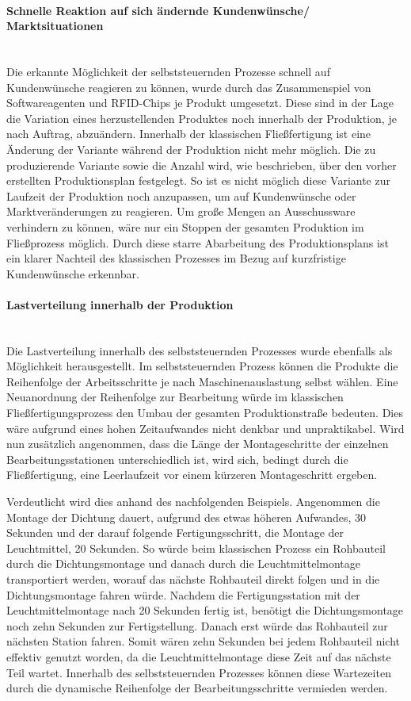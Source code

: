 \paragraph{Schnelle Reaktion auf sich ändernde Kundenwünsche/
Marktsituationen} \hfill \\
Die erkannte Möglichkeit der selbststeuernden Prozesse schnell auf Kundenwünsche
reagieren zu können, wurde durch das Zusammenspiel von Softwareagenten und
RFID-Chips je Produkt umgesetzt. Diese sind in der Lage die Variation eines
herzustellenden Produktes noch innerhalb der Produktion, je nach Auftrag,
abzuändern. Innerhalb der klassischen Fließfertigung ist eine Änderung der
Variante während der Produktion nicht mehr möglich. Die zu produzierende
Variante sowie die Anzahl wird, wie beschrieben, über den vorher erstellten
Produktionsplan festgelegt. So ist es nicht möglich diese Variante zur
Laufzeit der Produktion noch anzupassen, um auf Kundenwünsche oder
Marktveränderungen zu reagieren. Um große Mengen an Ausschussware verhindern zu
können, wäre nur ein Stoppen der gesamten Produktion im Fließprozess möglich.
Durch diese starre Abarbeitung des Produktionsplans ist ein klarer Nachteil des
klassischen Prozesses im Bezug auf kurzfristige Kundenwünsche erkennbar.

\paragraph{Lastverteilung innerhalb der Produktion} \hfill \\
Die Lastverteilung innerhalb des selbststeuernden Prozesses wurde ebenfalls als
Möglichkeit herausgestellt. Im selbststeuernden Prozess können die Produkte die
Reihenfolge der Arbeitsschritte je nach Maschinenauslastung selbst wählen. Eine
Neuanordnung der Reihenfolge zur Bearbeitung würde im klassischen
Fließfertigungsprozess den Umbau der gesamten Produktionstraße bedeuten. Dies
wäre aufgrund eines hohen Zeitaufwandes nicht denkbar und unpraktikabel. Wird
nun zusätzlich angenommen, dass die Länge der Montageschritte der einzelnen
Bearbeitungsstationen unterschiedlich ist, wird sich, bedingt durch die
Fließfertigung, eine Leerlaufzeit vor einem kürzeren Montageschritt ergeben.

Verdeutlicht wird dies anhand des nachfolgenden Beispiels. Angenommen die
Montage der Dichtung dauert, aufgrund des etwas höheren Aufwandes, 30 Sekunden
und der darauf folgende Fertigungsschritt, die Montage der Leuchtmittel, 20
Sekunden. So würde beim klassischen Prozess ein Rohbauteil durch die
Dichtungsmontage und danach durch die Leuchtmittelmontage transportiert werden,
worauf das nächste Rohbauteil direkt folgen und in die Dichtungsmontage fahren
würde. Nachdem die Fertigungsstation mit der Leuchtmittelmontage nach 20
Sekunden fertig ist, benötigt die Dichtungsmontage noch zehn Sekunden zur
Fertigstellung. Danach erst würde das Rohbauteil zur nächsten Station fahren.
Somit wären zehn Sekunden bei jedem Rohbauteil nicht effektiv genutzt worden,
da die Leuchtmittelmontage diese Zeit auf das nächste Teil wartet.
Innerhalb des selbststeuernden Prozesses können diese Wartezeiten durch die
dynamische Reihenfolge der Bearbeitungsschritte vermieden werden.

